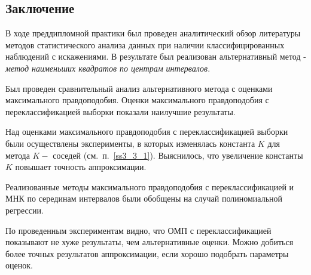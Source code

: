 \begin{center}
    \section*{Заключение}
\end{center}
{}

В ходе преддипломной практики был проведен аналитический обзор литературы методов статистического анализа данных при наличии классифицированных наблюдений с искажениями.
В результате был реализован альтернативный метод - \textit{метод наименьших квадратов по центрам интервалов}.

Был проведен сравнительный анализ альтернативного метода с оценками максимального правдоподобия. Оценки максимального правдоподобия с переклассификацией выборки показали наилучшие результаты. 

Над оценками максимального правдоподобия с переклассификацией выборки были осуществлены эксперименты, в которых изменялась константа $K$ для метода $K-$ соседей (см.~п.~\ref{ss3_3_1}). Выяснилось, что увеличение константы $K$ повышает точность аппроксимации.

Реализованные методы максимального правдоподобия с переклассификацией и МНК по серединам интервалов  были обобщены на случай полиномиальной регрессии.


По проведенным экспериментам видно, что ОМП с переклассификацией показывают не хуже результаты, чем альтернативные оценки.
Можно добиться более точных результатов аппроксимации, если хорошо подобрать параметры оценок.